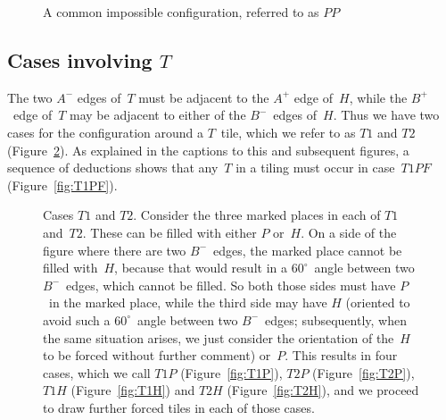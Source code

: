 \begin{figure}[htp!]
\begin{center}
\end{center}
\caption{A common impossible configuration, referred to as $PP$}
\label{fig:PP}
\end{figure}

\subsection{Cases involving $T$}

The two $A^-$ edges of~$T$ must be adjacent to the $A^+$ edge of~$H$,
while the $B^+$~edge of~$T$ may be adjacent to either of the
$B^-$~edges of~$H$.  Thus we have two cases for the configuration
around a $T$~tile, which we refer to as $T1$ and $T2$
(Figure~\ref{fig:T1T2}).  As explained in the captions to this and
subsequent figures, a sequence of deductions shows that any~$T$ in a
tiling must occur in case~$T1PF$ (Figure~\ref{fig:T1PF}).

\begin{figure}[htp!]
\begin{center}
 \qquad {}%
\end{center}
\caption{Cases $T1$ and $T2$.  Consider the three marked places in
  each of $T1$ and~$T2$.  These can be filled with either $P$ or~$H$.
  On a side of the figure where there are two $B^-$~edges, the marked
  place cannot be filled with~$H$, because that would result in a
  $60^\circ$~angle between two $B^-$~edges, which cannot be filled.
  So both those sides must have $P$~in the marked place, while the
  third side may have $H$ (oriented to avoid such a $60^\circ$~angle
  between two $B^-$~edges; subsequently, when the same situation
  arises, we just consider the orientation of the~$H$ to be forced
  without further comment) or~$P$.  This results in four cases, which
  we call $T1P$ (Figure~\ref{fig:T1P}), $T2P$ (Figure~\ref{fig:T2P}),
  $T1H$ (Figure~\ref{fig:T1H}) and $T2H$ (Figure~\ref{fig:T2H}), and
  we proceed to draw further forced tiles in each of those cases.}
\label{fig:T1T2}
\end{figure}


